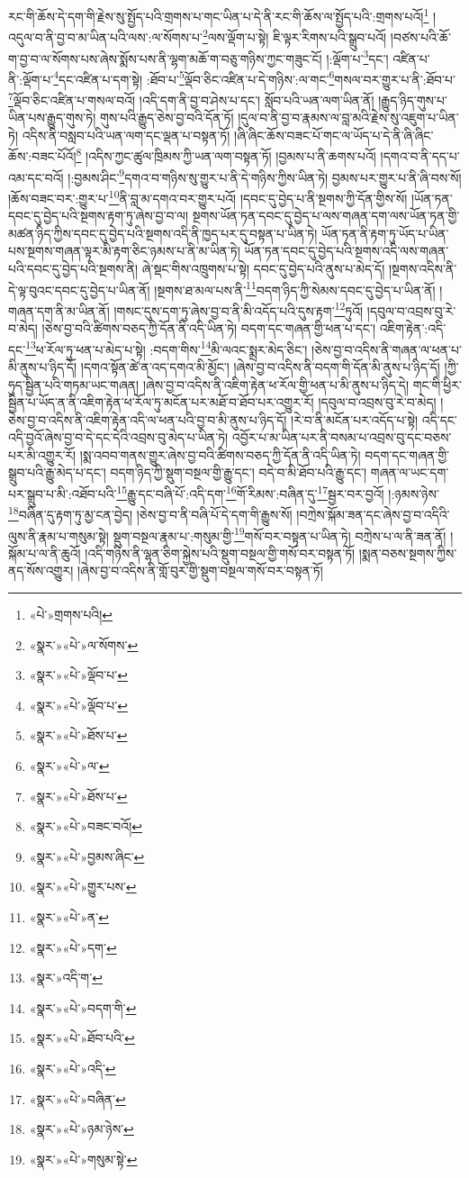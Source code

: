 རང་གི་ཆོས་དེ་དག་གི་རྗེས་སུ་སྤྱོད་པའི་གྲགས་པ་གང་ཡིན་པ་དེ་ནི་རང་གི་ཆོས་ལ་སྤྱོད་པའི་:གྲགས་པའོ།\footnote{«པེ་»གྲགས་པའི།} །འདུལ་བ་ནི་བྱ་བ་མ་ཡིན་པའི་ལས་:ལ་སོགས་པ་\footnote{«སྣར་»«པེ་»ལ་སོགས་}ལས་ལྡོག་པ་སྟེ། ཇི་ལྟར་རིགས་པའི་སྒྲུབ་པའོ། །བཙས་པའི་ཆོ་ག་བྱ་བ་ལ་སོགས་པས་ཞེས་སྨོས་པས་ནི་ལྷག་མཆོ་ག་བཅུ་གཉིས་ཀྱང་གཟུང་ངོ། །:ལྡོག་པ་\footnote{«སྣར་»«པེ་»ལྡོབ་པ་}དང་། འཛིན་པ་ནི་:ལྡོག་པ་\footnote{«སྣར་»«པེ་»ལྡོབ་པ་}དང་འཛིན་པ་དག་སྟེ། :ཐོབ་པ་\footnote{«སྣར་»«པེ་»ཐོས་པ་}ལྡོབ་ཅིང་འཛིན་པ་དེ་གཉིས་:ལ་གང་\footnote{«སྣར་»«པེ་»ལ་}གསལ་བར་གྱུར་པ་ནི་:ཐོབ་པ་\footnote{«སྣར་»«པེ་»ཐོས་པ་}ལྡོབ་ཅིང་འཛིན་པ་གསལ་བའོ། །འདི་དག་ནི་བྱ་བ་ཤེས་པ་དང་། སློབ་པའི་ཡན་ལག་ཡིན་ནོ། །རྒྱུད་ཉིད་གུས་པ་ཡིན་པས་རྒྱུད་གུས་ཏེ། གུས་པའི་རྒྱུད་ཅེས་བྱ་བའི་དོན་ཏོ། །དུལ་བ་ནི་བྱ་བ་རྣམས་ལ་བླ་མའི་རྗེས་སུ་འཇུག་པ་ཡིན་ཏེ། འདིས་ནི་བསླབ་པའི་ཡན་ལག་དང་ལྡན་པ་བསྟན་ཏོ། །ཞི་ཞིང་ཆོས་བཟང་པོ་གང་ལ་ཡོད་པ་དེ་ནི་ཞི་ཞིང་ཆོས་:བཟང་པོའོ།\footnote{«སྣར་»«པེ་»བཟང་བའོ།} །འདིས་ཀྱང་ཚུལ་ཁྲིམས་ཀྱི་ཡན་ལག་བསྟན་ཏོ། །བྱམས་པ་ནི་ཆགས་པའོ། །དགའ་བ་ནི་དད་པ་འམ་དང་བའོ། །:བྱམས་ཤིང་\footnote{«སྣར་»«པེ་»བྱམས་ཞིང་}དགའ་བ་གཉིས་སུ་གྱུར་པ་ནི་དེ་གཉིས་ཀྱིས་ཡིན་ཏེ། བྱམས་པར་གྱུར་པ་ནི་ཞི་བས་སོ། །ཆོས་བཟང་བར་:གྱུར་པ་\footnote{«སྣར་»«པེ་»གྱུར་པས་}ནི་བླ་མ་དགའ་བར་གྱུར་པའོ། །དབང་དུ་བྱེད་པ་ནི་སྔགས་ཀྱི་དོན་གྱིས་སོ། །ཡོན་ཏན་དབང་དུ་བྱེད་པའི་སྔགས་རྟག་ཏུ་ཞེས་བྱ་བ་ལ། སྔགས་ཡོན་ཏན་དབང་དུ་བྱེད་པ་ལས་གཞན་དག་ལས་ཡོན་ཏན་གྱི་མཚན་ཉིད་ཀྱིས་དབང་དུ་བྱེད་པའི་སྔགས་འདི་ནི་ཁྱད་པར་དུ་བསྟན་པ་ཡིན་ཏེ། ཡོན་ཏན་ནི་རྟག་ཏུ་ཡོད་པ་ཡིན་པས་སྔགས་གཞན་ལྟར་མི་རྟག་ཅིང་ཉམས་པ་ནི་མ་ཡིན་ཏེ། ཡོན་ཏན་དབང་དུ་བྱེད་པའི་སྔགས་འདི་ལས་གཞན་པའི་དབང་དུ་བྱེད་པའི་སྔགས་ནི། ཞེ་སྡང་གིས་འཁྲུགས་པ་སྟེ། དབང་དུ་བྱེད་པའི་ནུས་པ་མེད་དོ། །སྔགས་འདིས་ནི་དེ་ལྟ་བུའང་དབང་དུ་བྱེད་པ་ཡིན་ནོ། །སྔགས་ཐ་མལ་པས་ནི་\footnote{«སྣར་»«པེ་»ན་}བདག་ཉིད་ཀྱི་སེམས་དབང་དུ་བྱེད་པ་ཡིན་ནོ། །གཞན་དག་ནི་མ་ཡིན་ནོ། །གསང་དུས་དག་ཏུ་ཞེས་བྱ་བ་ནི་མི་འདོད་པའི་དུས་རྟག་\footnote{«སྣར་»«པེ་»དག་}ཏུའོ། །དབུལ་བ་འབྲས་བུ་རེ་བ་མེད། །ཅེས་བྱ་བའི་ཚིགས་བཅད་ཀྱི་དོན་ནི་འདི་ཡིན་ཏེ། བདག་དང་གཞན་གྱི་ཕན་པ་དང་། འཇིག་རྟེན་:འདི་དང་\footnote{«སྣར་»འདི་ག་}ཕ་རོལ་ཏུ་ཕན་པ་མེད་པ་སྟེ། :བདག་གིས་\footnote{«སྣར་»«པེ་»བདག་གི་}མི་ལའང་སྨྲར་མེད་ཅིང་། །ཅེས་བྱ་བ་འདིས་ནི་གཞན་ལ་ཕན་པ་མི་ནུས་པ་ཉིད་དོ། །དགའ་སྟོན་ཚེ་ན་འད་དགའ་མི་མྱོང་། །ཞེས་བྱ་བ་འདིས་ནི་བདག་གི་དོན་མི་ནུས་པ་ཉིད་དོ། །ཀྱི་ཧུད་སྦྱིན་པའི་གཏམ་ཡང་གཞན། །ཞེས་བྱ་བ་འདིས་ནི་འཇིག་རྟེན་ཕ་རོལ་གྱི་ཕན་པ་མི་ནུས་པ་ཉིད་དེ། གང་གི་ཕྱིར་སྦྱིན་པ་ཡོད་ན་ནི་འཇིག་རྟེན་ཕ་རོལ་ཏུ་མངོན་པར་མཐོ་བ་ཐོབ་པར་འགྱུར་རོ། །དབུལ་བ་འབྲས་བུ་རེ་བ་མེད། །ཅེས་བྱ་བ་འདིས་ནི་འཇིག་རྟེན་འདི་ལ་ཕན་པའི་བྱ་བ་མི་ནུས་པ་ཉིད་དོ། །རེ་བ་ནི་མངོན་པར་འདོད་པ་སྟེ། འདི་དང་འདི་བྱའོ་ཞེས་བྱ་བ་དེ་དང་དེའི་འབྲས་བུ་མེད་པ་ཡིན་ཏེ། འབྱོར་པ་མ་ཡིན་པར་ནི་བསམ་པ་འབྲས་བུ་དང་བཅས་པར་མི་འགྱུར་རོ། །སྨ་འབབ་གནས་གྱུར་ཞེས་བྱ་བའི་ཚིགས་བཅད་ཀྱི་དོན་ནི་འདི་ཡིན་ཏེ། བདག་དང་གཞན་གྱི་སྒྲུབ་པའི་རྒྱུ་མེད་པ་དང་། བདག་ཉིད་ཀྱི་སྡུག་བསྔལ་གྱི་རྒྱུ་དང་། བདེ་བ་མི་ཐོབ་པའི་རྒྱུ་དང་། གཞན་ལ་ཡང་དག་པར་སྒྲུབ་པ་མི་:འཐོབ་པའི་\footnote{«སྣར་»«པེ་»ཐོབ་པའི་}རྒྱུ་དང་བཞི་པོ་:འདི་དག་\footnote{«སྣར་»«པེ་»འདི་}གོ་རིམས་:བཞིན་དུ་\footnote{«སྣར་»«པེ་»བཞིན་}སྦྱར་བར་བྱའོ། །:ཉམས་ཉེས་\footnote{«སྣར་»«པེ་»ཉམ་ཉེས་}བཞིན་དུ་རྟག་ཏུ་མྱ་ངན་བྱེད། །ཅེས་བྱ་བ་ནི་བཞི་པོ་དེ་དག་གི་རྒྱུས་སོ། །བཀྲེས་སྐོམ་ཟན་དང་ཞེས་བྱ་བ་འདིའི་ལུས་ནི་རྣམ་པ་གསུམ་སྟེ། སྡུག་བསྔལ་རྣམ་པ་:གསུམ་གྱི་\footnote{«སྣར་»«པེ་»གསུམ་སྟེ་}གསོ་བར་བསྟན་པ་ཡིན་ཏེ། བཀྲེས་པ་ལ་ནི་ཟན་ནོ། །སྐོམ་པ་ལ་ནི་ཆུའོ། །འདི་གཉིས་ནི་ལྷན་ཅིག་སྐྱེས་པའི་སྡུག་བསྔལ་གྱི་གསོ་བར་བསྟན་ཏོ། །སྨན་བཅས་སྔགས་ཀྱིས་ནད་སོས་འགྱུར། །ཞེས་བྱ་བ་འདིས་ནི་གློ་བུར་གྱི་སྡུག་བསྔལ་གསོ་བར་བསྟན་ཏོ། 